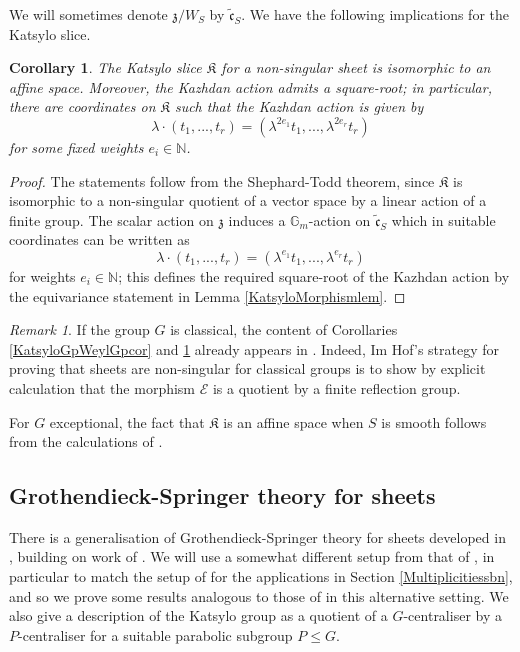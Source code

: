 \documentclass{amsart}
\newtheorem{corollary}[theorem]{Corollary}
\theoremstyle{remark}
\newtheorem{remark}[theorem]{Remark}
\numberwithin{theorem}{section}
\numberwithin{equation}{section}
\begin{document}
We will sometimes denote $\mathfrak{z}/W_S$ by $\tilde{\mathfrak{c}}_S$. We have the following implications for the Katsylo slice.

\begin{corollary}\label{KatsyloAffinecor}
    The Katsylo slice $\mathfrak{K}$ for a non-singular sheet is isomorphic to an affine space. Moreover, the Kazhdan action admits a square-root; in particular, there are coordinates on $\mathfrak{K}$ such that the Kazhdan action is given by
        \begin{equation}\label{KatsyloAffine1eqn}
        \lambda \cdot (t_1,...,t_r)=(\lambda^{2e_1}t_1, ...,\lambda^{2e_r}t_r)
        \end{equation}
        for some fixed weights $e_i \in \mathbb{N}$.
\end{corollary}

\begin{proof}
The statements follow from the Shephard-Todd theorem, since $\mathfrak{K}$ is isomorphic to a non-singular quotient of a vector space by a linear action of a finite group. The scalar action on $\mathfrak{z}$ induces a $\mathbb{G}_m$-action on $\tilde{\mathfrak{c}}_S$ which in suitable coordinates can be written as
    \begin{equation}\label{KatsyloAffine2eqn}
        \lambda \cdot (t_1,...,t_r)=(\lambda^{e_1}t_1, ...,\lambda^{e_r}t_r)
    \end{equation}
for weights $e_i \in \mathbb{N}$; this defines the required square-root of the Kazhdan action by the equivariance statement in Lemma \ref{KatsyloMorphismlem}.
\end{proof}

\begin{remark}\label{ClassicalKatsylormk}
    If the group $G$ is classical, the content of Corollaries \ref{KatsyloGpWeylGpcor} and \ref{KatsyloAffinecor} already appears in \cite{ImHof}. Indeed, Im Hof's strategy for proving that sheets are non-singular for classical groups is to show by explicit calculation that the morphism $\mathcal E$ is a quotient by a finite reflection group.

    For $G$ exceptional, the fact that $\mathfrak{K}$ is an affine space when $S$ is smooth follows from the calculations of \cite{Bulois}.
\end{remark}

\subsection{Grothendieck-Springer theory for sheets}\label{GSSheetssbn}
There is a generalisation of Grothendieck-Springer theory for sheets developed in \cite{Broer1}, building on work of \cite{BB}. We will use a somewhat different setup from that of \cite{Broer1}, in particular to match the setup of \cite{Losev4} for the applications in Section \ref{Multiplicitiessbn}, and so we prove some results analogous to those of \cite{Broer1} in this alternative setting. We also give a description of the Katsylo group as a quotient of a $G$-centraliser by a $P$-centraliser for a suitable parabolic subgroup $P \leq G$. 
\end{document}
